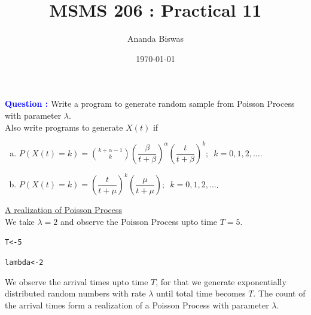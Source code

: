 \documentclass[11pt, a4paper]{article}\usepackage[]{graphicx}\usepackage[]{xcolor}
\title{MSMS 206 : Practical 11}
\author{Ananda Biswas}
\date{\today}
\makeatletter
\newcommand{\hlnum}[1]{\textcolor[rgb]{0.686,0.059,0.569}{#1}}%
\newcommand{\hldef}[1]{\textcolor[rgb]{0.345,0.345,0.345}{#1}}%
\newcommand{\hlkwb}[1]{\textcolor[rgb]{0.69,0.353,0.396}{#1}}%
\newenvironment{kframe}{%
 \def\at@end@of@kframe{}%
 \ifinner\ifhmode%
  \def\at@end@of@kframe{\end{minipage}}%
  \begin{minipage}{\columnwidth}%
 \fi\fi%
 \def\FrameCommand##1{\hskip\@totalleftmargin \hskip-\fboxsep
 \colorbox{shadecolor}{##1}\hskip-\fboxsep
     \hskip-\linewidth \hskip-\@totalleftmargin \hskip\columnwidth}%
 \MakeFramed {\advance\hsize-\width
   \@totalleftmargin\z@ \linewidth\hsize
   \@setminipage}}%
 {\par\unskip\endMakeFramed%
 \at@end@of@kframe}
\newenvironment{knitrout}{}{} %
\makeatother
\begin{document}
\maketitle


 \hspace{0.2cm} \textcolor{blue}{\textbf{Question : }} Write a program to generate random sample from Poisson Process with parameter $\lambda$. \\[0.5em]

Also write programs to generate $X(t)$ if 

\begin{enumerate}[(a)]

\item ${\displaystyle P(X(t) = k) = \binom{k + \alpha - 1}{k} \left( \dfrac{\beta}{t+\beta} \right)^{\alpha} \left( \dfrac{t}{t+\beta} \right)^k ; \,\,\, k = 0, 1, 2, \ldots}$.

\item $P(X(t) = k) = \left( \dfrac{t}{t+\mu} \right)^k \left( \dfrac{\mu}{t+\mu} \right); \,\,\, k = 0, 1, 2, \ldots$.

\end{enumerate}

\vspace{0.2cm}

\faArrowAltCircleRight[regular] \hspace{0.2cm} \underline{A realization of Poisson Process}\\[1em]

We take $\lambda = 2$ and observe the Poisson Process upto time $T = 5$.

\begin{knitrout}
\color{fgcolor}\begin{kframe}
\begin{alltt}
\hldef{T} \hlkwb{<-} \hlnum{5}

\hldef{lambda} \hlkwb{<-} \hlnum{2}
\end{alltt}
\end{kframe}
\end{knitrout}

We observe the arrival times upto time $T$, for that we generate exponentially distributed random numbers with rate $\lambda$ until total time becomes $T$. The count of the arrival times form a realization of a Poisson Process with parameter $\lambda$.
\end{document}
